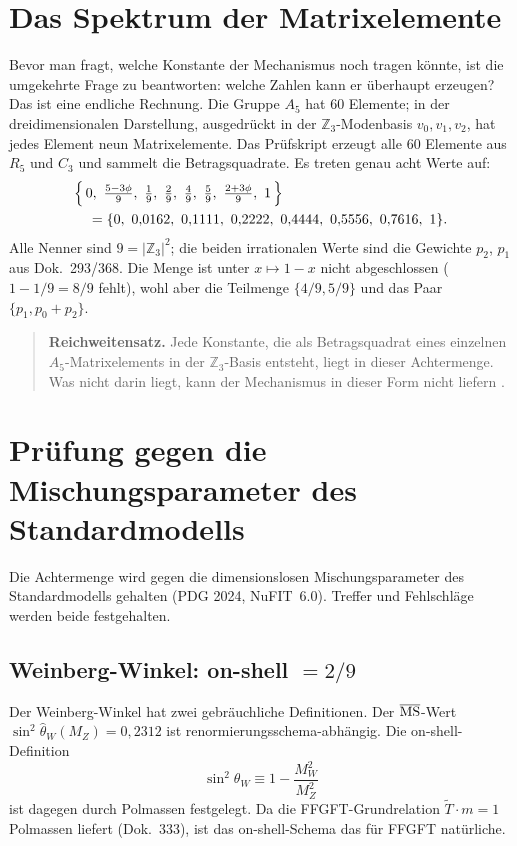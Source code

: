 \section{Das Spektrum der Matrixelemente \BM}
\label{sec:spektrum}

Bevor man fragt, welche Konstante der Mechanismus noch tragen könnte, ist die
umgekehrte Frage zu beantworten: welche Zahlen kann er überhaupt erzeugen?
Das ist eine endliche Rechnung. Die Gruppe $A_5$ hat 60 Elemente; in der
dreidimensionalen Darstellung, ausgedrückt in der $\mathbb Z_3$-Modenbasis
$v_0,v_1,v_2$, hat jedes Element neun Matrixelemente. Das Prüfskript erzeugt
alle 60 Elemente aus $R_5$ und $C_3$ und sammelt die Betragsquadrate. Es
treten genau acht Werte auf:
\begin{align*}
  &\Bigl\{\,0,\ \tfrac{5-3\phi}{9},\ \tfrac19,\ \tfrac29,\ \tfrac49,\
  \tfrac59,\ \tfrac{2+3\phi}{9},\ 1\,\Bigr\} \\
  &\quad = \{0,\ 0{,}0162,\ 0{,}1111,\ 0{,}2222,\ 0{,}4444,\ 0{,}5556,\ 0{,}7616,\ 1\}.
\end{align*}
Alle Nenner sind $9 = |\mathbb Z_3|^2$; die beiden irrationalen Werte sind
die Gewichte $p_2$, $p_1$ aus Dok.~293/368. Die Menge ist unter
$x\mapsto 1-x$ nicht abgeschlossen ($1-1/9 = 8/9$ fehlt), wohl aber die
Teilmenge $\{4/9,5/9\}$ und das Paar $\{p_1, p_0+p_2\}$.

\begin{quote}
\textbf{Reichweitensatz.} Jede Konstante, die als Betragsquadrat eines
einzelnen $A_5$-Matrixelements in der $\mathbb Z_3$-Basis entsteht, liegt in
dieser Achtermenge. Was nicht darin liegt, kann der Mechanismus in dieser Form
nicht liefern \BM.
\end{quote}

\section{Prüfung gegen die Mischungsparameter des Standardmodells}
\label{sec:pruefung}

Die Achtermenge wird gegen die dimensionslosen Mischungsparameter des
Standardmodells gehalten (PDG 2024, NuFIT~6.0). Treffer und Fehlschläge
werden beide festgehalten.

\subsection{Weinberg-Winkel: on-shell \texorpdfstring{$=2/9$}{= 2/9} \KM}
\label{sec:weinberg}

Der Weinberg-Winkel hat zwei gebräuchliche Definitionen. Der
$\overline{\rm MS}$-Wert $\sin^2\hat\theta_W(M_Z) = 0{,}2312$ ist
renormierungsschema-abhängig. Die on-shell-Definition
\[
  \sin^2\theta_W \equiv 1 - \frac{M_W^2}{M_Z^2}
\]
ist dagegen durch Polmassen festgelegt. Da die FFGFT-Grundrelation
$\tilde T\cdot m = 1$ Polmassen liefert (Dok.~333), ist das on-shell-Schema
das für FFGFT natürliche.

